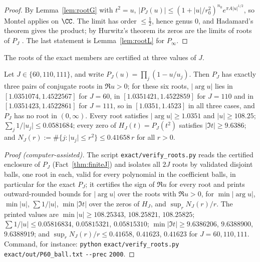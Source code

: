 \begin{proof}
By Lemma~\ref{lem:rootG} with $t^2=u$, $\lvert P_J(u)\rvert\le(1+\lvert u\rvert/r_0^2)^{n_0}e^{\pi A\lvert u\rvert^{1/2}}$, so Montel applies
on $\CC$. The limit has order $\le\frac12$, hence genus $0$, and Hadamard's theorem gives the product; by Hurwitz's
theorem its zeros are the limits of roots of $P_J$ \cite[VII.2.5]{Con73}. The last statement is Lemma~\ref{lem:rootL} for $P_\infty$.
\end{proof}

The roots of the exact members are certified at three values of $J$.

\begin{proposition}\label{prop:roots}
Let $J\in\{60,110,111\}$, and write $P_J(u)=\prod_j(1-u/u_j)$. Then $P_J$ has exactly three pairs of conjugate roots in $\Re u>0$; for
these six roots, $\lvert\arg u\rvert$ lies in $[1.0351074,1.4522567]$ for $J=60$, in $[1.0351421,1.4522859]$ for $J=110$ and in
$[1.0351423,1.4522861]$ for $J=111$, so in $[1.0351,1.4523]$ in all three cases, and $P_J$ has no root in $(0,\infty)$. Every root satisfies $\lvert\arg u\rvert\ge1.0351$ and
$\lvert u\rvert\ge108.25$; $\sum_j1/\lvert u_j\rvert\le0.0581684$; every zero of $H_J(t)=P_J(t^2)$ satisfies $\lvert\Im t\rvert\ge9.6386$; and
$N_J(r):=\#\{j:\lvert u_j\rvert\le r^2\}\le0.41658\,r$ for all $r>0$.
\end{proposition}

\begin{proof}[Proof \textup{(computer-assisted)}]
The script \nolinkurl{exact/verify_roots.py} reads the certified enclosure of $P_J$ (Fact~\ref{thm:finiteJ}) and isolates all
$2J$ roots by validated disjoint balls, one root in each, valid for every polynomial in the coefficient balls, in particular for
the exact $P_J$; it certifies the sign of $\Re u$ for every root and prints outward-rounded bounds for $\lvert\arg u\rvert$ over the roots
with $\Re u>0$, for $\min\lvert\arg u\rvert$, $\min\lvert u\rvert$, $\sum1/\lvert u\rvert$, $\min\lvert\Im t\rvert$ over the zeros of $H_J$, and
$\sup_rN_J(r)/r$. The printed values are $\min\lvert u\rvert\ge108.25343$, $108.25821$, $108.25825$; $\sum1/\lvert u\rvert\le0.05816834$,
$0.05815321$, $0.05815310$; $\min\lvert\Im t\rvert\ge9.6386206$, $9.6388900$, $9.6388919$; and $\sup_rN_J(r)/r\le0.41658$, $0.41623$, $0.41623$
for $J=60,110,111$. Command, for instance: \texttt{python} \nolinkurl{exact/verify_roots.py} \nolinkurl{exact/out/P60_ball.txt}
\nolinkurl{--prec} \nolinkurl{2000}.
\end{proof}

